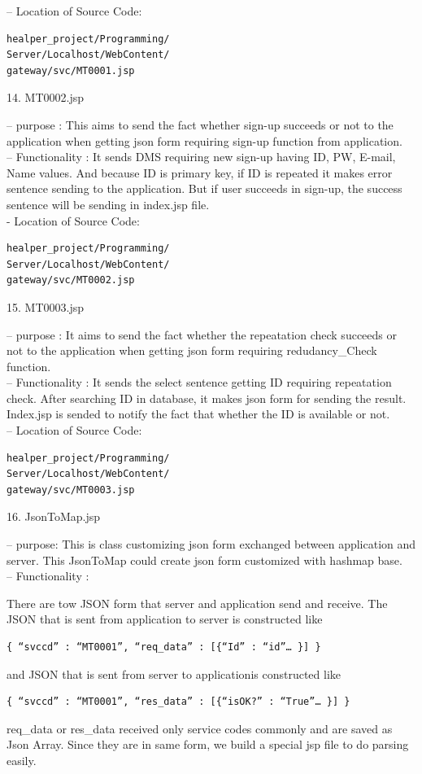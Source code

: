 \documentclass[conference]{IEEEtran}
\begin{document}
 -- Location of Source Code:

\begin{verbatim}
healper_project/Programming/
Server/Localhost/WebContent/
gateway/svc/MT0001.jsp
\end{verbatim}

14. MT0002.jsp

 -- purpose : 
This aims to send the fact whether sign-up succeeds or not to the application when getting json form requiring sign-up function from application.\\

 -- Functionality : 
It sends DMS requiring new sign-up having ID, PW, E-mail, Name values. And because ID is primary key, if ID is repeated it makes error sentence sending to the application. But if user succeeds in sign-up, the success sentence will be sending in index.jsp file. \\

- Location of Source Code:

\begin{verbatim}
healper_project/Programming/
Server/Localhost/WebContent/
gateway/svc/MT0002.jsp
\end{verbatim}

15. MT0003.jsp

 -- purpose : 
  It aims to send the fact whether the repeatation check succeeds or not to the application when getting json form requiring redudancy\_{}Check function.  \\

 -- Functionality : 
  It sends the select sentence getting ID requiring repeatation check. After searching ID in database, it makes json form for sending the result. Index.jsp is sended to notify the fact that whether the ID is available or not. \\
 
 -- Location of Source Code:

\begin{verbatim}
healper_project/Programming/
Server/Localhost/WebContent/
gateway/svc/MT0003.jsp
\end{verbatim}

16. JsonToMap.jsp

 -- purpose: 
 This is class customizing json form exchanged between application and server. This JsonToMap could create json form customized with hashmap base.\\
 
-- Functionality : 

There are tow JSON form that server and application send and receive. The JSON that is sent from application to server is constructed like 
\begin{verbatim}
{ “svccd” : “MT0001”, “req_data” : [{“Id” : “id”… }] }
\end{verbatim}
and JSON that is sent from server to applicationis constructed like 
\begin{verbatim}
{ “svccd” : “MT0001”, “res_data” : [{“isOK?” : “True”… }] }
\end{verbatim}
req\_{}data or res\_{}data received only service codes commonly and are saved as Json Array. Since they are in same form, we build a special jsp file to do parsing easily.\\
\end{document}
